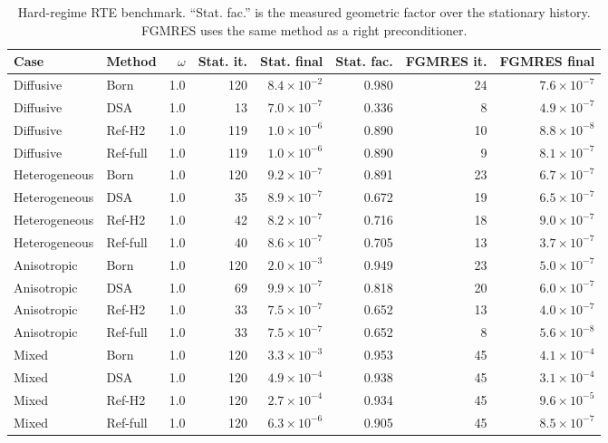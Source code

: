 \documentclass[11pt]{article}
\begin{document}
\begin{table}[t]
\centering
\scriptsize
\begin{tabular}{llrrrrrr}
\toprule
Case & Method & \(\omega\) & Stat. it. & Stat. final & Stat. fac. & FGMRES it. & FGMRES final\\
\midrule
Diffusive & Born & 1.0 & 120 & \(8.4{\times}10^{-2}\) & 0.980 & 24 & \(7.6{\times}10^{-7}\)\\
Diffusive & DSA & 1.0 & 13 & \(7.0{\times}10^{-7}\) & 0.336 & 8 & \(4.9{\times}10^{-7}\)\\
Diffusive & Ref-H2 & 1.0 & 119 & \(1.0{\times}10^{-6}\) & 0.890 & 10 & \(8.8{\times}10^{-8}\)\\
Diffusive & Ref-full & 1.0 & 119 & \(1.0{\times}10^{-6}\) & 0.890 & 9 & \(8.1{\times}10^{-7}\)\\
Heterogeneous & Born & 1.0 & 120 & \(9.2{\times}10^{-7}\) & 0.891 & 23 & \(6.7{\times}10^{-7}\)\\
Heterogeneous & DSA & 1.0 & 35 & \(8.9{\times}10^{-7}\) & 0.672 & 19 & \(6.5{\times}10^{-7}\)\\
Heterogeneous & Ref-H2 & 1.0 & 42 & \(8.2{\times}10^{-7}\) & 0.716 & 18 & \(9.0{\times}10^{-7}\)\\
Heterogeneous & Ref-full & 1.0 & 40 & \(8.6{\times}10^{-7}\) & 0.705 & 13 & \(3.7{\times}10^{-7}\)\\
Anisotropic & Born & 1.0 & 120 & \(2.0{\times}10^{-3}\) & 0.949 & 23 & \(5.0{\times}10^{-7}\)\\
Anisotropic & DSA & 1.0 & 69 & \(9.9{\times}10^{-7}\) & 0.818 & 20 & \(6.0{\times}10^{-7}\)\\
Anisotropic & Ref-H2 & 1.0 & 33 & \(7.5{\times}10^{-7}\) & 0.652 & 13 & \(4.0{\times}10^{-7}\)\\
Anisotropic & Ref-full & 1.0 & 33 & \(7.5{\times}10^{-7}\) & 0.652 & 8 & \(5.6{\times}10^{-8}\)\\
Mixed & Born & 1.0 & 120 & \(3.3{\times}10^{-3}\) & 0.953 & 45 & \(4.1{\times}10^{-4}\)\\
Mixed & DSA & 1.0 & 120 & \(4.9{\times}10^{-4}\) & 0.938 & 45 & \(3.1{\times}10^{-4}\)\\
Mixed & Ref-H2 & 1.0 & 120 & \(2.7{\times}10^{-4}\) & 0.934 & 45 & \(9.6{\times}10^{-5}\)\\
Mixed & Ref-full & 1.0 & 120 & \(6.3{\times}10^{-6}\) & 0.905 & 45 & \(8.5{\times}10^{-7}\)\\
\bottomrule
\end{tabular}
\caption{Hard-regime RTE benchmark. ``Stat. fac.'' is the measured geometric
factor over the stationary history. FGMRES uses the same method as a right
preconditioner.}
\label{tab:rte-hard-cases}
\end{table}
\end{document}
